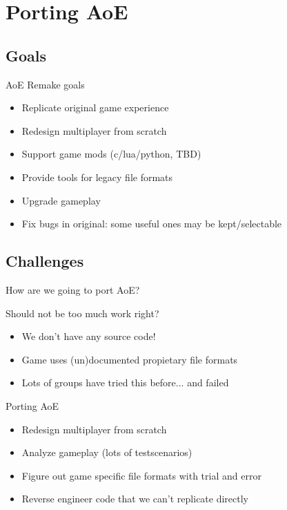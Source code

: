 \documentclass{beamer}
\begin{document}

\section{Porting AoE}

\subsection{Goals}

\begin{frame}{AoE Remake goals}

	\begin{itemize}
		\item Replicate original game experience
		\item Redesign multiplayer from scratch
		\item Support game mods (c/lua/python, TBD)
		\item Provide tools for legacy file formats
		\item Upgrade gameplay
		\item Fix bugs in original: some useful ones may be kept/selectable
	\end{itemize}

\end{frame}


\subsection{Challenges}

\begin{frame}{How are we going to port AoE?}

	Should not be too much work right?

	\begin{itemize}
		\item We don't have any source code!
		\item Game uses (un)documented propietary file formats
		\item Lots of groups have tried this before... and failed
	\end{itemize}

\end{frame}


\begin{frame}{Porting AoE}

	\begin{itemize}
		\item Redesign multiplayer from scratch
		\item Analyze gameplay (lots of testscenarios)
		\item Figure out game specific file formats with trial and error
		\item Reverse engineer code that we can't replicate directly
	\end{itemize}

\end{frame}
\end{document}
